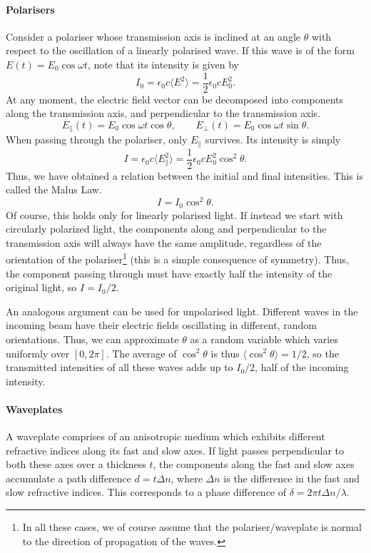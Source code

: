 \documentclass[11pt]{article}
\begin{document}
        \paragraph{Polarisers}
        Consider a polariser whose transmission axis is inclined at an angle $\theta$ with respect to the oscillation of a linearly polarised wave.
        If this wave is of the form $E(t) = E_0\cos{\omega t}$, note that its intensity is given by
        \[
                I_0 = \epsilon_0 c \langle E^2 \rangle = \frac{1}{2}\epsilon_0 c E_0^2.
        \]
        At any moment, the electric field vector can be decomposed into components along the transmission axis, and perpendicular to the transmission
        axis.
        \[
                E_\parallel(t) = E_0\cos{\omega t}\cos\theta, \qquad E_\perp(t) = E_0\cos{\omega t}\sin\theta.
        \]
        When passing through the polariser, only $E_\parallel$ survives. Its intensity is simply
        \[
                I = \epsilon_0 c \langle E_\parallel^2 \rangle = \frac{1}{2}\epsilon_0 c E_0^2\cos^2\theta.
        \]
        Thus, we have obtained a relation between the initial and final intensities. This is called the Malus Law.
        \[
                I = I_0 \cos^2\theta.
        \]
        Of course, this holds only for linearly polarised light. If instead we start with circularly polarized light, the components
        along and perpendicular to the transmission axis will always have the same amplitude, regardless of the orientation of the polariser\footnote{
                In all these cases, we of course assume that the polariser/waveplate is normal to the direction of propagation of the waves.
        }
        (this is a simple consequence of symmetry). Thus, the component passing through must have exactly half the intensity of the original light,
        so $I = I_0 /2$.

        An analogous argument can be used for unpolarised light. Different waves in the incoming beam have their electric fields oscillating
        in different, random orientations. Thus, we can approximate $\theta$ as a random variable which varies uniformly over $[0, 2\pi]$.
        The average of $\cos^2\theta$ is thus $\langle\cos^2\theta\rangle = 1 /2$, so the transmitted intensities of all these waves
        adds up to $I_0 /2$, half of the incoming intensity.

        \paragraph{Waveplates}
        A waveplate comprises of an anisotropic medium which exhibits different refractive indices along its fast and slow axes. If
        light passes perpendicular to both these axes over a thickness $t$, the components along the fast and slow axes accumulate a
        path difference $d = t\Delta n$, where $\Delta n$ is the difference in the fast and slow refractive indices.
        This corresponds to a phase difference of $\delta = 2\pi t\Delta n / \lambda$.
\end{document}

